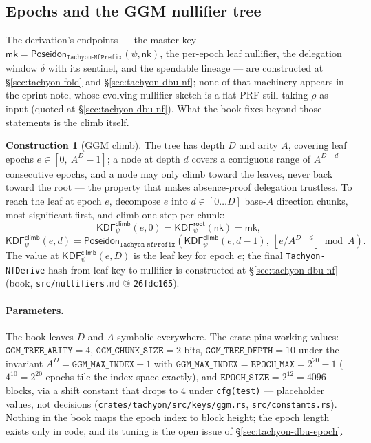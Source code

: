 \documentclass[11pt,a4paper]{article}
\theoremstyle{definition}
\newtheorem{construction}[theorem]{Construction}
\newcommand{\nksym}{\ensuremath{\mathsf{nk}}}
\begin{document}
\subsection{Epochs and the GGM nullifier tree}\label{sec:tachyon-design-ggm}

The derivation's endpoints --- the master key
$\mathsf{mk} = \mathsf{Poseidon}_{\texttt{Tachyon-NfPrefix}}(\psi, \nksym)$,
the per-epoch leaf nullifier, the delegation window $\delta$ with its
sentinel, and the spendable lineage --- are constructed at
\S\ref{sec:tachyon-fold} and \S\ref{sec:tachyon-dbu-nf}; none of that
machinery appears in the eprint note, whose evolving-nullifier sketch is a
flat PRF still taking $\rho$ as input (quoted at
\S\ref{sec:tachyon-dbu-nf}).
What the book fixes beyond those statements is the climb itself.

\begin{construction}[GGM climb]\label{def:tachyon-design-climb}
The tree has depth $D$ and arity $A$, covering leaf epochs
$e \in [0,\ A^D - 1]$; a node at depth $d$ covers a contiguous range of
$A^{D-d}$ consecutive epochs, and a node may only climb toward the leaves,
never back toward the root --- the property that makes absence-proof
delegation trustless. To reach the leaf at epoch $e$, decompose $e$ into
$d \in [0 \ldots D]$ base-$A$ direction chunks, most significant first, and
climb one step per chunk:
\[
\mathsf{KDF}^{\mathsf{climb}}_\psi(e, 0) =
  \mathsf{KDF}^{\mathsf{root}}_\psi(\nksym) = \mathsf{mk},
\]
\[
\mathsf{KDF}^{\mathsf{climb}}_\psi(e, d) =
  \mathsf{Poseidon}_{\texttt{Tachyon-NfPrefix}}\!\left(
    \mathsf{KDF}^{\mathsf{climb}}_\psi(e, d-1),\
    \left\lfloor e / A^{D-d} \right\rfloor \bmod A
  \right).
\]
The value at $\mathsf{KDF}^{\mathsf{climb}}_\psi(e, D)$ is the leaf key for
epoch $e$; the final \texttt{Tachyon-NfDerive} hash from leaf key to
nullifier is constructed at \S\ref{sec:tachyon-dbu-nf} (book,
\texttt{src/nullifiers.md} @ \texttt{26fdc165}).
\end{construction}

\paragraph{Parameters.} The book leaves $D$ and $A$ symbolic everywhere.
The crate pins working values: $\texttt{GGM\_TREE\_ARITY} = 4$,
$\texttt{GGM\_CHUNK\_SIZE} = 2$ bits, $\texttt{GGM\_TREE\_DEPTH} = 10$
under the invariant $A^D = \texttt{GGM\_MAX\_INDEX} + 1$ with
$\texttt{GGM\_MAX\_INDEX} = \texttt{EPOCH\_MAX} = 2^{20} - 1$ ($4^{10} =
2^{20}$ epochs tile the index space exactly), and $\texttt{EPOCH\_SIZE} =
2^{12} = 4096$ blocks, via a shift constant that drops to $4$ under
\texttt{cfg(test)} --- placeholder values, not decisions
(\texttt{crates/tachyon/src/keys/ggm.rs}, \texttt{src/constants.rs}).
Nothing in the book maps the epoch index to block height; the epoch length
exists only in code, and its tuning is the open issue of
\S\ref{sec:tachyon-dbu-epoch}.
\end{document}
